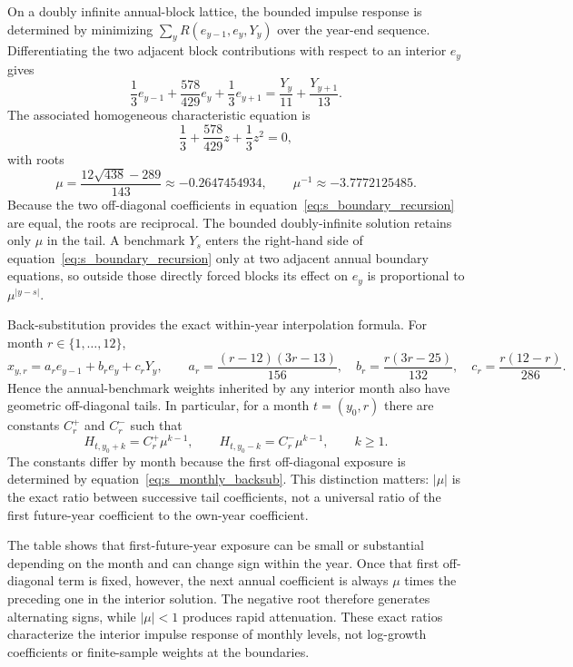 \documentclass[12pt]{article}
\begin{document}
On a doubly infinite annual-block lattice, the bounded impulse response is determined by minimizing $\sum_y R(e_{y-1},e_y,Y_y)$ over the year-end sequence. Differentiating the two adjacent block contributions with respect to an interior $e_y$ gives
\begin{equation}
\frac{1}{3}e_{y-1}+\frac{578}{429}e_y+\frac{1}{3}e_{y+1}
=\frac{Y_y}{11}+\frac{Y_{y+1}}{13}.
\label{eq:s_boundary_recursion}
\end{equation}
The associated homogeneous characteristic equation is
\[
\frac{1}{3}+\frac{578}{429}z+\frac{1}{3}z^2=0,
\]
with roots
\[
\mu=\frac{12\sqrt{438}-289}{143}\approx-0.2647454934,
\qquad
\mu^{-1}\approx-3.7772125485.
\]
Because the two off-diagonal coefficients in equation~\eqref{eq:s_boundary_recursion} are equal, the roots are reciprocal. The bounded doubly-infinite solution retains only $\mu$ in the tail. A benchmark $Y_s$ enters the right-hand side of equation~\eqref{eq:s_boundary_recursion} only at two adjacent annual boundary equations, so outside those directly forced blocks its effect on $e_y$ is proportional to $\mu^{|y-s|}$.

Back-substitution provides the exact within-year interpolation formula. For month $r\in\{1,\ldots,12\}$,
\begin{equation}
x_{y,r}
= a_r e_{y-1}+b_r e_y+c_rY_y,
\qquad
a_r=\frac{(r-12)(3r-13)}{156},\quad
b_r=\frac{r(3r-25)}{132},\quad
c_r=\frac{r(12-r)}{286}.
\label{eq:s_monthly_backsub}
\end{equation}
Hence the annual-benchmark weights inherited by any interior month also have geometric off-diagonal tails. In particular, for a month $t=(y_0,r)$ there are constants $C_r^+$ and $C_r^-$ such that
\[
H_{t,y_0+k}=C_r^+\mu^{k-1},\qquad
H_{t,y_0-k}=C_r^-\mu^{k-1},\qquad k\geq1.
\]
The constants differ by month because the first off-diagonal exposure is determined by equation~\eqref{eq:s_monthly_backsub}. This distinction matters: $|\mu|$ is the exact ratio between successive tail coefficients, not a universal ratio of the first future-year coefficient to the own-year coefficient.



The table shows that first-future-year exposure can be small or substantial depending on the month and can change sign within the year. Once that first off-diagonal term is fixed, however, the next annual coefficient is always $\mu$ times the preceding one in the interior solution. The negative root therefore generates alternating signs, while $|\mu|<1$ produces rapid attenuation. These exact ratios characterize the interior impulse response of monthly levels, not log-growth coefficients or finite-sample weights at the boundaries.
\end{document}
